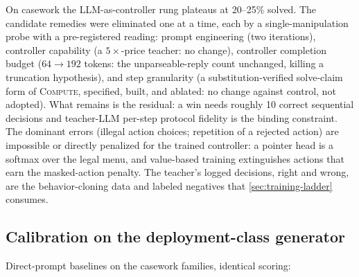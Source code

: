 On casework the LLM-as-controller rung plateaus at 20--25\% solved. The
candidate remedies were eliminated one at a time, each by a
single-manipulation probe with a pre-registered reading: prompt
engineering (two iterations), controller capability (a $5\times$-price
teacher: no change), controller completion budget ($64 \to 192$ tokens:
the unparseable-reply count unchanged, killing a truncation hypothesis),
and step granularity (a substitution-verified solve-claim form of
\textsc{Compute}, specified, built, and ablated: no change against
control, not adopted). What remains is the residual: a win needs roughly
10 correct sequential decisions and teacher-LLM per-step protocol
fidelity is the binding constraint. The dominant errors (illegal action
choices; repetition of a rejected action) are impossible or directly
penalized for the trained controller: a pointer head is a softmax over
the legal menu, and value-based training extinguishes actions that earn
the masked-action penalty. The teacher's logged decisions, right and
wrong, are the behavior-cloning data and labeled negatives that
\cref{sec:training-ladder} consumes.

\subsection{Calibration on the deployment-class generator}
\label{sec:prelim-calibration}

Direct-prompt baselines on the casework families, identical scoring:


